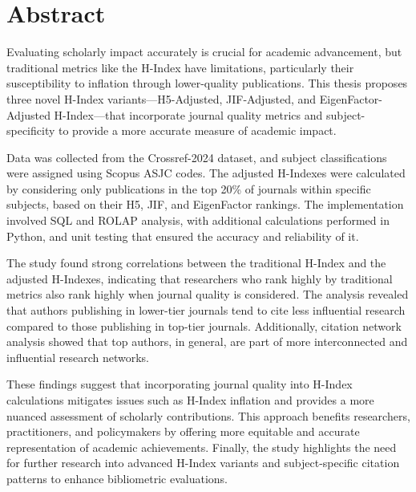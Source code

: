 \chapter*{\centering Abstract}
Evaluating scholarly impact accurately is crucial for academic advancement, but traditional metrics
like the H-Index have limitations, particularly their susceptibility to inflation through
lower-quality publications.  This thesis proposes three novel H-Index variants—H5-Adjusted,
JIF-Adjusted, and EigenFactor-Adjusted H-Index—that incorporate journal quality metrics
and subject-specificity to provide a more accurate measure of academic impact.

Data was collected from the Crossref-2024 dataset, and subject classifications
were assigned using Scopus ASJC codes. The adjusted H-Indexes were calculated
by considering only publications in the top 20\% of journals within specific
subjects, based on their H5, JIF, and EigenFactor rankings. The implementation
involved SQL and ROLAP analysis, with additional calculations performed in
Python, and unit testing that ensured the accuracy and reliability of it.

The study found strong correlations between the traditional H-Index and the
adjusted H-Indexes, indicating that researchers who rank highly by traditional
metrics also rank highly when journal quality is considered. The analysis
revealed that authors publishing in lower-tier journals tend to cite less
influential research compared to those publishing in top-tier journals.
Additionally, citation network analysis showed that top authors, in general,
are part of more interconnected and influential research networks.

These findings suggest that incorporating journal quality into H-Index
calculations mitigates issues such as H-Index inflation and provides a more
nuanced assessment of scholarly contributions. This approach benefits
researchers, practitioners, and policymakers by offering more equitable and
accurate representation of academic achievements. Finally, the study highlights
the need for further research into advanced H-Index variants and
subject-specific citation patterns to enhance bibliometric evaluations.
